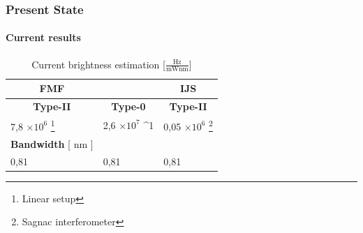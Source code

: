 \documentclass[serif,8pt]{beamer}
\begin{document}
\addtocounter{framenumber}{-1}
\begin{frame}
	\frametitle{Present State}
	\framesubtitle{Current results}
	\begin{table}
		\begin{center}
			\caption{Current brightness estimation [$\frac{\text{Hz}}{\text{mWnm}}$]}
			\begin{tabular}[c|c|c]{|ll|l|}
				\hline
				\multicolumn{1}{|c}{\hfill\textbf{FMF}\hfill} &&
				\multicolumn{1}{c|}{\textbf{IJS}}\\
				\hline
				\multicolumn{1}{|c|}{\textbf{Type-II}} &
				\multicolumn{1}{c|}{\textbf{Type-0}} &
				\multicolumn{1}{c|}{\textbf{Type-II}}\\
				\hline
				7,8 $\times10^6$ \footnote{Linear setup} & 2,6 $\times 10^7 $  ^1 & 0,05 $\times 10^6$ \footnote{Sagnac interferometer}\\
				\hline
				\multicolumn{1}{|c}{\textbf{Bandwidth} [ nm ]} &\multicolumn{1}{c}{ } & \multicolumn{1}{c|}{ }\\
				\hline
				0,81 & 0,81 & 0,81\\
				\hline
			\end{tabular}
		\end{center}
	\end{table}
\end{frame}
\end{document}
